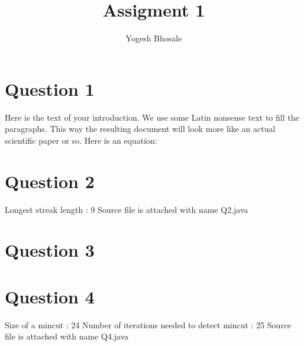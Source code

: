 \documentclass{article}
\begin{document}
\title{Assigment 1}
\author{Yogesh Bhosale}

\maketitle



\section{Question 1}

Here is the text of your introduction. We use some Latin nonsense text to fill
the paragraphs. This way the resulting document will look more like an actual
scientific paper or so. Here is an equation:

\section{Question 2}
Longest streak length : 9 \linebreak
Source file is attached with name Q2.java

\section{Question 3}

\section{Question 4}
Size of a mincut : 24 \linebreak
Number of iterations needed to detect mincut : 25 \linebreak
Source file is attached with name Q4.java


\end{document}
